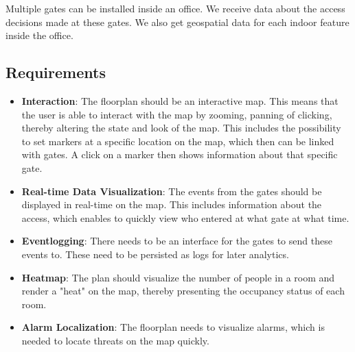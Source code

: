 Multiple gates can be installed inside an office. We receive data about the access decisions made at these gates. We also get geospatial data for each indoor feature inside the office.

\subsection{Requirements}

\begin{itemize}
	\item \textbf{Interaction}:
	The floorplan should be an interactive map. This means that the user is able to interact with the map by zooming, panning of clicking, thereby altering the state and look of the map. This includes the possibility to set markers at a specific location on the map, which then can be linked with gates. A click on a marker then shows information about that specific gate.
	\item \textbf{Real-time Data Visualization}:
	 The events from the gates should be displayed in real-time on the map. This includes information about the access, which enables to quickly view who entered at what gate at what time.
	\item \textbf{Eventlogging}:
	There needs to be an interface for the gates to send these events to. These need to be persisted as logs for later analytics.
	\item \textbf{Heatmap}:
	The plan should visualize the number of people in a room and render a "heat" on the map, thereby presenting the occupancy status of each room.
	\item \textbf{Alarm Localization}:
	The floorplan needs to visualize alarms, which is needed to locate threats on the map quickly.
\end{itemize}

\clearpage



